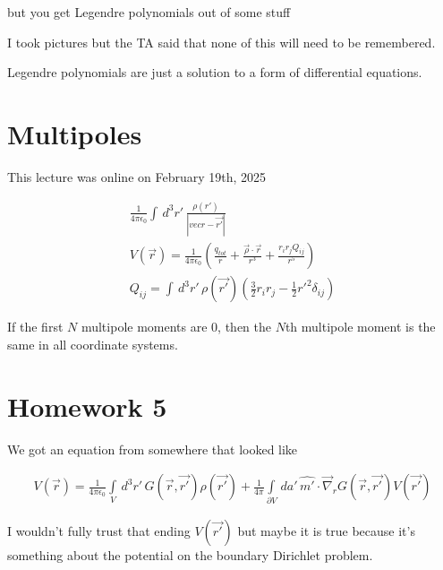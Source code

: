 \documentclass[fleqn]{report}
\newcommand{\del}{\partial}
\newcommand{\equations} [1] {
\begin{gather*}
#1
\end{gather*}
}
\begin{document}
but you get Legendre polynomials out of some stuff 

I took pictures but the TA said that none of this will need to be 
remembered.

Legendre polynomials are just a solution to a form of differential equations. 

\section{Multipoles}
This lecture was online on February 19th, 2025

\equations{
    \frac{1}{4 \pi \epsilon_0}
    \int \, d^3 r' \, 
    \frac{\rho(r')}{|vec{r} - \vec{r'}|}
    \\
    V(\vec r)
    =
    \frac{1}{4 \pi \epsilon_0}
    \left(
        \frac{q_{tot}}{r}
        +
        \frac{\vec \rho \cdot \vec r}{r^3}
        +
        \frac{r_i r_j Q_{ij}}{r^5}
    \right)
    \\
    Q_{ij}
    =
    \int \, d^3 r' \, 
    \rho(\vec{r'})
    \left(
        \frac{3}{2} r_i r_j 
        - 
        \frac{1}{2} {r'}^2
        \delta_{ij}
    \right)
}
If the first $N$ multipole moments are $0$, then the $N$th multipole 
moment is the same in all coordinate systems. 

\section{Homework 5}
We got an equation from somewhere that looked like 
\equations{
    V(\vec r)
    =
    \frac{1}{4 \pi \epsilon_0}
    \int\limits_V \, d^3 r' \, 
    G(\vec{r}, \vec{r'})
    \rho(\vec{r'})
    +
    \frac{1}{4 \pi}
    \int\limits_{\del V} \, da' \, 
    \hat{m'} \cdot \vec{\nabla}_r 
    G(\vec{r}, \vec{r'})
    V(\vec{r'})
}
I wouldn't fully trust that ending $ V(\vec{r'}) $
but maybe it is true because it's something about the potential on the boundary 
Dirichlet problem. 
\end{document}
